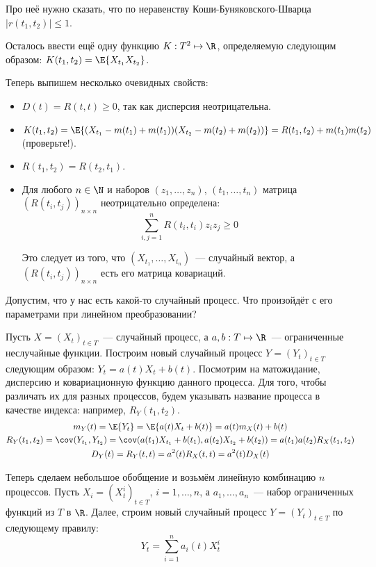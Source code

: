 Про неё нужно сказать, что по неравенству Коши-Буняковского-Шварца \(|r(t_{1}, 
t_{2})| \leq 1\).

Осталось ввести ещё одну функцию \(K : T^{2} \mapsto \R\), определяемую 
следующим образом: \(K(t_{1}, t_{2}) = \E{X_{t_{1}}X_{t_{2}}}\).

Теперь выпишем несколько очевидных свойств:
\begin{itemize}
	\item \(D(t) = R(t, t) \geq 0\), так как дисперсия неотрицательна.
	\item \(K(t_{1}, t_{2}) = \E{(X_{t_{1}} - m(t_{1}) + m(t_{1}))(X_{t_{2}} - 
	m(t_{2}) + m(t_{2}))}  = R(t_{1}, t_{2}) + m(t_{1})m(t_{2})\) (проверьте!).
	\item \(R(t_{1}, t_{2}) = R(t_{2}, t_{1})\).
	\item Для любого \(n \in \N\) и наборов \((z_{1}, \ldots, z_{n})\), 
	\((t_{1}, \dots, t_{n})\) матрица \((R(t_{i}, t_{j}))_{n \times n}\) 
	неотрицательно определена:
	\[
		\sum_{i, j = 1}^{n} R(t_{i}, t_{i})z_{i}z_{j} \geq 0
	\]
	
	Это следует из того, что \((X_{t_{1}}, \dots, X_{t_{n}})\)~--- случайный 
	вектор, а \((R(t_{i}, t_{j}))_{n \times n}\) есть его матрица ковариаций.
\end{itemize}

Допустим, что у нас есть какой-то случайный процесс. Что произойдёт с его 
параметрами при линейном преобразовании?

Пусть \(X = (X_{t})_{t \in T}\)~--- случайный процесс, а \(a, b : T \mapsto 
\R\)~--- ограниченные неслучайные функции. Построим новый случайный процесс \(Y 
= (Y_{t})_{t \in T}\) следующим образом: \(Y_t = a(t)X_{t} + b(t)\). Посмотрим 
на матожидание, дисперсию и ковариационную функцию данного процесса. Для того, 
чтобы различать их для разных процессов, будем указывать название процесса в 
качестве индекса: например, \(R_{Y}(t_{1}, t_{2})\).
\begin{gather*}
	m_{Y}(t) = \E{Y_{t}} = \E{a(t)X_{t} + b(t)} = a(t)m_{X}(t) + b(t) \\
	R_{Y}(t_{1}, t_{2}) = \cov(Y_{t_{1}}, Y_{t_{2}}) = \cov(a(t_{1})X_{t_{1}} + 
	b(t_{1}), a(t_{2})X_{t_{2}} + b(t_{2})) = a(t_{1})a(t_{2})R_{X}(t_{1}, 
	t_{2}) \\
	D_{Y}(t) = R_{Y}(t, t) = a^{2}(t)R_{X}(t, t) = a^{2}(t)D_{X}(t)
\end{gather*}

Теперь сделаем небольшое обобщение и возьмём линейную комбинацию \(n\) 
процессов. Пусть \(X_{i} = (X_{t}^{i})_{t \in T}\), \(i = 1, \dots, n\), а 
\(a_{1}, \dots, 
a_{n}\)~--- набор ограниченных функций из \(T\) в \(\R\). Далее, строим новый 
случайный процесс \(Y = (Y_{t})_{t \in T}\) по следующему правилу:
\[
	Y_{t} = \sum_{i = 1}^{n} a_{i}(t)X_{t}^{i}
\]

